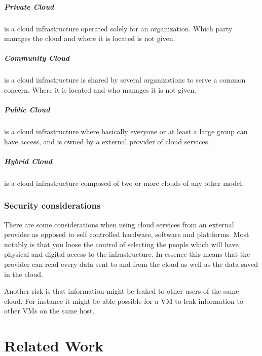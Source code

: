 \documentclass[pdftex,english,10pt,b5paper,twoside]{book}
\begin{document}
\paragraph{Private Cloud} is a cloud infrastructure operated solely for an
organization. Which party manages the cloud and where it is located is not
given.

\paragraph{Community Cloud} is a cloud infrastructure is shared by several
organizations to serve a common concern. Where it is located and who manages it
is not given.

\paragraph{Public Cloud} is a cloud infrastructure where basically everyone or
at least a large group can have access, and is owned by a external provider of
cloud services.

\paragraph{Hybrid Cloud} is a cloud infrastructure composed of two or more
clouds of any other model.

\subsection{Security considerations}
There are some considerations when using cloud services from an external provider
as opposed to self controlled hardware, software and plattforms. Most notably
is that you loose the control of selecting the people which will have physical
and digital access to the infrastructure. In essence this means that the
provider can read every data sent to and from the cloud as well as the data
saved in the cloud.

Another risk is that information might be leaked to other users of the same
cloud. For instance it might be able possible for a \ac{VM} to leak information
to other \ac{VM}s on the same host.

\chapter{Related Work}
\end{document}
